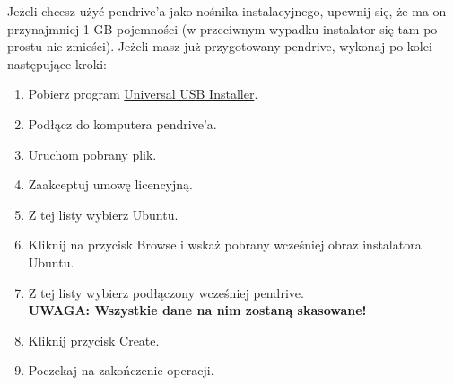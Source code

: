 Jeżeli chcesz użyć pendrive'a jako nośnika instalacyjnego, upewnij się, że ma on przynajmniej 1 GB pojemności (w przeciwnym wypadku instalator się tam po prostu nie zmieści). Jeżeli masz już przygotowany pendrive, wykonaj po kolei następujące kroki:

\begin{enumerate}[label=\protect\circled{\arabic*}]
\item Pobierz program \href{http://www.pendrivelinux.com/downloads/Universal-USB-Installer/Universal-USB-Installer-1.9.5.2.exe}{Universal USB Installer}.
\item Podłącz do komputera pendrive'a.
\item Uruchom pobrany plik.
\item Zaakceptuj umowę licencyjną.
\item Z tej listy wybierz Ubuntu.
\item Kliknij na przycisk \textcolor{ubuntu_orange}{Browse} i wskaż pobrany wcześniej obraz instalatora Ubuntu.
\item Z tej listy wybierz podłączony wcześniej pendrive.\\
\textbf{UWAGA: Wszystkie dane na nim zostaną skasowane!}
\item Kliknij przycisk \textcolor{ubuntu_orange}{Create}.
\item Poczekaj na zakończenie operacji.
\end{enumerate}

